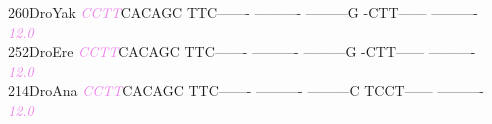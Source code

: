 \documentclass[11pt,twoside,reqno,a4paper]{article}
\begin{document}
{260\hspace*{1\charwidth}DroYak	\textit{\textcolor{violet}{C}}\textit{\textcolor{violet}{C}}\textit{\textcolor{violet}{T}}\textit{\textcolor{violet}{T}}CACAGC	TTC-------	----------	---------G	-CTT------	----------	\\
\hspace*{4\charwidth}\hspace*{7\charwidth}\hspace*{0\charwidth}\textit{\textcolor{violet}{12.0}}\hspace*{1\charwidth}\hspace*{1\charwidth}\hspace*{1\charwidth}\hspace*{1\charwidth}\hspace*{1\charwidth}\hspace*{1\charwidth}\\
252\hspace*{1\charwidth}DroEre	\textit{\textcolor{violet}{C}}\textit{\textcolor{violet}{C}}\textit{\textcolor{violet}{T}}\textit{\textcolor{violet}{T}}CACAGC	TTC-------	----------	---------G	-CTT------	----------	\\
\hspace*{4\charwidth}\hspace*{7\charwidth}\hspace*{0\charwidth}\textit{\textcolor{violet}{12.0}}\hspace*{1\charwidth}\hspace*{1\charwidth}\hspace*{1\charwidth}\hspace*{1\charwidth}\hspace*{1\charwidth}\hspace*{1\charwidth}\\
214\hspace*{1\charwidth}DroAna	\textit{\textcolor{violet}{C}}\textit{\textcolor{violet}{C}}\textit{\textcolor{violet}{T}}\textit{\textcolor{violet}{T}}CACAGC	TTC-------	----------	---------C	TCCT------	----------	\\
\hspace*{4\charwidth}\hspace*{7\charwidth}\hspace*{0\charwidth}\textit{\textcolor{violet}{12.0}}\hspace*{1\charwidth}\hspace*{1\charwidth}\hspace*{1\charwidth}\hspace*{1\charwidth}\hspace*{1\charwidth}\hspace*{1\charwidth}\\
}
\end{document}
